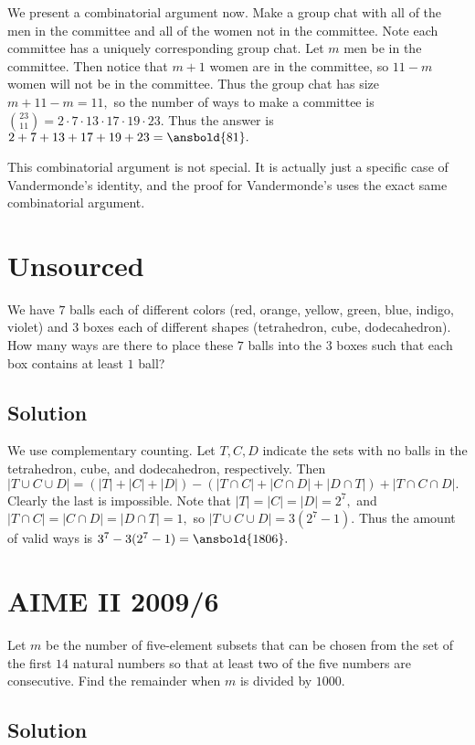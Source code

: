 \documentclass{article}
\begin{document}
We present a combinatorial argument now. Make a group chat with all of the men in the committee and all of the women not in the committee. Note each committee has a uniquely corresponding group chat. Let $m$ men be in the committee. Then notice that $m+1$ women are in the committee, so $11-m$ women will not be in the committee. Thus the group chat has size $m+11-m=11,$ so the number of ways to make a committee is $\binom{23}{11}=2\cdot 7\cdot 13\cdot 17\cdot 19\cdot 23.$ Thus the answer is $2+7+13+17+19+23=\ansbold{81}.$

This combinatorial argument is not special. It is actually just a specific case of Vandermonde's identity, and the proof for Vandermonde's uses the exact same combinatorial argument.

\pagebreak\section{Unsourced}
We have $7$ balls each of different colors (red, orange, yellow, green, blue, indigo, violet) and $3$ boxes each of different shapes (tetrahedron, cube, dodecahedron). How many ways are there to place these $7$ balls into the $3$ boxes such that each box contains at least $1$ ball?

\subsection{Solution}

We use complementary counting. Let $T,C,D$ indicate the sets with no balls in the tetrahedron, cube, and dodecahedron, respectively. Then $|T\cup C\cup D|=(|T|+|C|+|D|)-(|T\cap C|+|C\cap D|+|D\cap T|)+|T\cap C\cap D|.$ Clearly the last is impossible. Note that $|T|=|C|=|D|=2^7,$ and $|T\cap C|=|C\cap D|=|D\cap T|=1,$ so $|T\cup C\cup D|=3(2^7-1).$ Thus the amount of valid ways is $3^7-3(2^7-1)=\ansbold{1806}.$

\pagebreak\section{AIME II 2009/6}

Let $m$ be the number of five-element subsets that can be chosen from the set of the first $14$ natural numbers so that at least two of the five numbers are consecutive. Find the remainder when $m$ is divided by $1000$.

\subsection{Solution}
\end{document}
